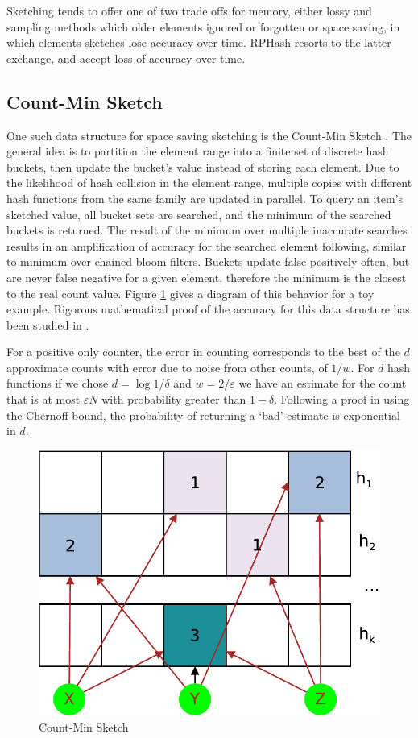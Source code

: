 Sketching tends to offer one of two trade offs for memory, either lossy and sampling methods which older elements
ignored or forgotten or space saving, in which elements sketches lose accuracy over time.  \textsf{RPHash} resorts to the latter
exchange, and accept loss of accuracy over time.

\subsection{Count-Min Sketch}

One such data structure for space saving sketching is the Count-Min Sketch \cite{cormode}. The general idea is to
partition the element range into a finite set of discrete hash buckets, then update the bucket's value instead of
storing each element.  Due to the likelihood of hash collision in the element range, multiple copies with different hash
functions from the same family are updated in parallel.  To query an item's sketched value, all bucket sets are
searched, and the minimum of the searched buckets is returned.  The result of the minimum over multiple inaccurate
searches results in an amplification of accuracy for the searched element following, similar to minimum over chained
bloom filters.  Buckets update false positively often, but are never false negative for a given element, therefore the
minimum is the closest to the real count value.  Figure \ref{countmin} gives a diagram of this behavior for a toy
example.  Rigorous mathematical proof of the accuracy for this data structure has been studied in \cite{cormode3}.

For a positive only counter, the error in counting corresponds to the best of the $d$ approximate counts with error due
to noise from other counts, of $1/w$.  For $d$ hash functions if we chose $d = \log 1/\delta$ and $w=2/\varepsilon$ we
have an estimate for the count that is at most $\varepsilon N$ with probability greater than $1-\delta$.  Following a
proof in \cite{cormode2} using the Chernoff bound, the probability of returning a `bad' estimate is exponential in $d$.

\begin{figure}
    \centerline{\includegraphics[width=.6\textwidth]{figs/countmin}}
    \caption{Count-Min Sketch}\label{countmin}
\end{figure}

